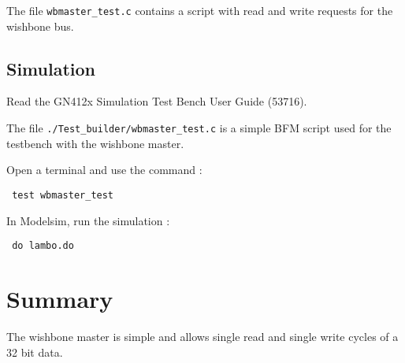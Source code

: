\documentclass[10pt,a4paper]{cerndoc}
\begin{document}
The file \verb+wbmaster_test.c+ contains a script with read and write requests for the wishbone bus.
  
  
  \subsection{Simulation}
Read the GN412x Simulation Test Bench User Guide (53716).

The file \verb+./Test_builder/wbmaster_test.c+ is a simple BFM script used for the testbench with the wishbone master.
 
Open a terminal and use the command :
\begin{lstlisting}
 test wbmaster_test
\end{lstlisting}

In Modelsim, run the simulation :
\begin{lstlisting}
 do lambo.do
\end{lstlisting}



  
    


\section*{Summary}
The wishbone master is simple and allows single read and single write cycles of a 32 bit data.
\end{document}
